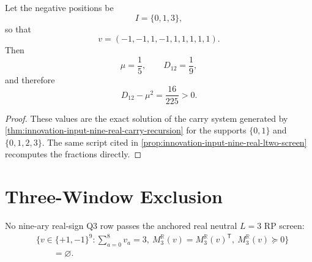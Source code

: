 \begin{proposition}
\label{prop:innovation-input-nine-real-ltwo-witness}
Let the negative positions be
$$
I=\{0,1,3\},
$$
so that
$$
v=(-1,-1,1,-1,1,1,1,1,1).
$$
Then
$$
\mu=\frac15,
\qquad
D_{12}=\frac19,
$$
and therefore
$$
D_{12}-\mu^2=\frac{16}{225}>0.
$$
\end{proposition}

\begin{proof}
These values are the exact solution of the carry system generated by
\autoref{thm:innovation-input-nine-real-carry-recursion} for the supports
$\{0,1\}$ and $\{0,1,2,3\}$. The same script cited in
\autoref{prop:innovation-input-nine-real-ltwo-screen} recomputes the
fractions directly.
\end{proof}

\section{Three-Window Exclusion}
\label{sec:innovation-input-nine-three-window-exclusion}

\begin{theorem}[No nine-ary real-sign $L=3$ RP row]
\label{thm:innovation-input-nine-real-no-lthree-rp-row}
No nine-ary real-sign Q3 row passes the anchored real neutral $L=3$ RP
screen:
$$
\begin{aligned}
&\{v\in\{+1,-1\}^9:
\sum_{a=0}^{8}v_a=3,\
M_3^{\mathbb R}(v)=M_3^{\mathbb R}(v)^{\mathsf T},\
M_3^{\mathbb R}(v)\succeq0\}\\
&\qquad=\varnothing.
\end{aligned}
$$
\end{theorem}

